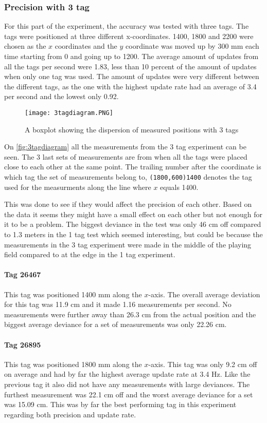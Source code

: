 \subsubsection{Precision with 3 tag}
For this part of the experiment, the accuracy was tested with three tags. 
The tags were positioned at three different x-coordinates. 
1400, 1800 and 2200 were chosen as the $x$ coordinates and the $y$ coordinate was moved up by 300 mm each time starting from 0 and going up to 1200.
The average amount of updates from all the tags per second were 1.83, less than 10 percent of the amount of updates when only one tag was used.
The amount of updates were very different between the different tags, as the one with the highest update rate had an average of 3.4 per second and the lowest only 0.92.
\begin{figure}[H]
    \centering
    \texttt{[image: 3tagdiagram.PNG]}
    \caption{A boxplot showing the dispersion of measured positions with 3 tags}
    \label{fig:3tagdiagram}
\end{figure}
\noindent
On \autoref{fig:3tagdiagram} all the measurements from the 3 tag experiment can be seen.
The 3 last sets of measurements are from when all the tags were placed close to each other at the same point.
The trailing number after the coordinate is which tag the set of measurements belong to, \texttt{(1800,600)1400} denotes the tag used for the measurments along the line where $x$ equals 1400.

This was done to see if they would affect the precision of each other.
Based on the data it seems they might have a small effect on each other but not enough for it to be a problem.
The biggest deviance in the test was only 46 cm off compared to 1.3 meters in the 1 tag test which seemed interesting, but could be because the measurements in the 3 tag experiment were made in the middle of the playing field compared to at the edge in the 1 tag experiment.

\paragraph{Tag 26467}
This tag was positioned 1400 mm along the $x$-axis.
The overall average deviation for this tag was 11.9 cm and it made 1.16 measurements per second.
No measurements were further away than 26.3 cm from the actual position and the biggest average deviance for a set of measurements was only 22.26 cm.


\paragraph{Tag 26895}
This tag was positioned 1800 mm along the $x$-axis.
This tag was only 9.2 cm off on average and had by far the highest average update rate at 3.4 Hz.
Like the previous tag it also did not have any measurements with large deviances.
The furthest measurement was 22.1 cm off and the worst average deviance for a set was 15.09 cm.
This was by far the best performing tag in this experiment regarding both precision and update rate.

